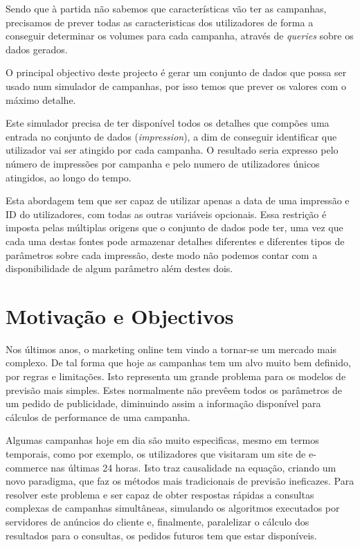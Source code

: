 \documentclass[9pt,a4paper]{extarticle}
\begin{document}
\begin{multicols}{2}
Sendo que à partida não sabemos que características vão ter as campanhas,
precisamos de prever todas as caracteristicas dos utilizadores de forma a
conseguir determinar os volumes para cada campanha, através de \emph{queries}
sobre os dados gerados. 

O principal objectivo deste projecto é gerar um conjunto de dados que possa ser
usado num simulador de campanhas, por isso temos que prever os valores com o
máximo detalhe.

Este simulador precisa de ter disponível todos os detalhes que compões uma
entrada no conjunto de dados (\emph{impression}), a dim de conseguir
identificar que utilizador vai ser atingido por cada campanha. O resultado
seria expresso pelo número de impressões por campanha e pelo numero de
utilizadores únicos atingidos, ao longo do tempo.

Esta abordagem tem que ser capaz de utilizar apenas a data de uma impressão e
ID do utilizadores, com todas as outras variáveis opcionais. Essa restrição é
imposta pelas múltiplas origens que o conjunto de dados pode ter, uma vez que
cada uma destas fontes pode armazenar detalhes diferentes e diferentes tipos de
parâmetros sobre cada impressão, deste modo não podemos contar com a
disponibilidade de algum parâmetro além destes dois.

\section{Motivação e Objectivos} \label{sec:goals}

Nos últimos anos, o marketing online tem vindo a tornar-se um mercado mais
complexo. De tal forma que hoje as campanhas tem um alvo muito bem definido,
por regras e limitações. Isto representa um grande problema para os modelos de
previsão mais simples. Estes normalmente não prevêem todos os parâmetros de um
pedido de publicidade, diminuindo assim a informação disponível para cálculos
de performance de uma campanha.

Algumas campanhas hoje em dia são muito especificas, mesmo em termos temporais,
como por exemplo, os utilizadores que visitaram um site de e-commerce nas
últimas 24 horas. Isto traz causalidade na equação, criando um novo paradigma,
que faz os métodos mais tradicionais de previsão ineficazes. Para resolver este
problema e ser capaz de obter respostas rápidas a consultas complexas de
campanhas simultâneas, simulando os algoritmos executados por servidores de
anúncios do cliente e, finalmente, paralelizar o cálculo dos resultados para o
consultas, os pedidos futuros tem que estar disponíveis. 


\end{multicols}
\end{document}
